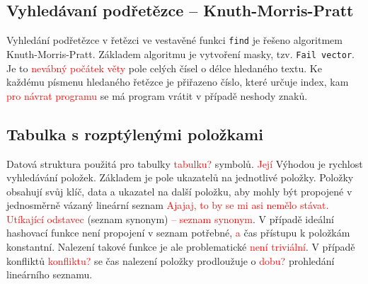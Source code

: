 \documentclass[a4paper, 12pt]{article}
\begin{document}
\subsection{Vyhledávaní podřetězce -- Knuth-Morris-Pratt}
Vyhledání podřetězce v řetězci ve vestavěné funkci \texttt{find} je řešeno
algoritmem Knuth-Morris-Pratt. Základem algoritmu je vytvoření masky, tzv.
\texttt{Fail vector}. Je to \textcolor{red}{nevábný počátek věty} pole celých čísel o délce hledaného textu. Ke
každému písmenu hledaného řetězce je přiřazeno číslo, které určuje index, kam \textcolor{red}{pro návrat programu}
se má program vrátit v případě neshody znaků.

\subsection{Tabulka s rozptýlenými položkami}
Datová struktura použitá pro tabulky \textcolor{red}{tabulku?} symbolů. \textcolor{red}{Její} Výhodou je rychlost vyhledávání
položek. Základem je pole ukazatelů na
jednotlivé položky. Položky obsahují svůj klíč, data a ukazatel na další
položku, aby mohly být propojené v jednosměrně vázaný lineární
seznam \textcolor{red}{Ajajaj, to by se mi asi nemělo stávat. Utíkající odstavec} (seznam synonym) \textcolor{red}{-- seznam synonym}. V případě ideální hashovací funkce není propojení v
seznam potřebné, \textcolor{red}{a} čas přístupu k položkám konstantní. Nalezení takové
funkce je ale problematické \textcolor{red}{není triviální}. V případě konfliktů \textcolor{red}{konfliktu?} se čas nalezení položky
prodloužuje o \textcolor{red}{dobu?} prohledání lineárního seznamu.

\newpage
\appendix
\end{document}
